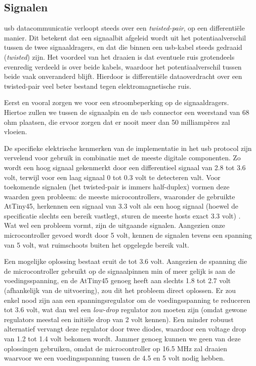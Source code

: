 \subsection{Signalen}

\ac{usb} datacommunicatie verloopt steeds over een \emph{twisted-pair}, op een differentiële manier. Dit betekent dat een signaalbit afgeleid wordt uit het potentiaalverschil tussen de twee signaaldragers, en dat die binnen een \ac{usb}-kabel steeds gedraaid (\emph{twisted}) zijn. Het voordeel van het draaien is dat eventuele ruis grotendeels evenredig verdeeld is over beide kabels, waardoor het potentiaalverschil tussen beide vaak onveranderd blijft. Hierdoor is differentiële dataoverdracht over een twisted-pair veel beter bestand tegen elektromagnetische ruis.

Eerst en vooral zorgen we voor een stroombeperking op de signaaldragers. Hiertoe zullen we tussen de signaalpin en de \ac{usb} connector een weerstand van 68 ohm plaatsen, die ervoor zorgen dat er nooit meer dan 50 milliampères zal vloeien.

De specifieke elektrische kenmerken van de implementatie in het \ac{usb} protocol zijn vervelend voor gebruik in combinatie met de meeste digitale componenten. Zo wordt een hoog signaal gekenmerkt door een differentieel signaal van 2.8 tot 3.6 volt, terwijl voor een laag signaal 0 tot 0.3 volt te detecteren valt. Voor toekomende signalen (het twisted-pair is immers half-duplex) vormen deze waarden geen probleem: de meeste microcontrollers, waaronder de gebruikte AtTiny45, herkennen een signaal van 3.3 volt als een hoog signaal (hoewel de specificatie slechts een bereik vastlegt, sturen de meeste hosts exact 3.3 volt) . Wat wel een probleem vormt, zijn de uitgaande signalen. Aangezien onze microcontroller gevoed wordt door 5 volt, kennen de signalen tevens een spanning van 5 volt, wat ruimschoots buiten het opgelegde bereik valt.

Een mogelijke oplossing bestaat eruit de  tot 3.6 volt. Aangezien de spanning die de microcontroller gebruikt op de signaalpinnen min of meer gelijk is aan de voedingsspanning, en de AtTiny45 genoeg heeft aan slechts 1.8 tot 2.7 volt (afhankelijk van de uitvoering), zou dit het probleem direct oplossen. Er zou enkel nood zijn aan een spanningsregulator om de voedingsspanning te reduceren tot 3.6 volt, wat dan wel een \emph{low-drop} regulator zou moeten zijn (omdat gewone regulators meestal een initiële drop van 2 volt kennen). Een minder robuust alternatief vervangt deze regulator door twee diodes, waardoor een voltage drop van 1.2 tot 1.4 volt bekomen wordt.
Jammer genoeg kunnen we geen van deze oplossingen gebruiken, omdat de microcontroller op 16.5 MHz zal draaien waarvoor we een voedingsspanning tussen de 4.5 en 5 volt nodig hebben.

